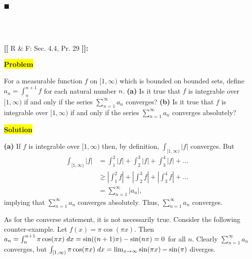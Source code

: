 \documentclass[12pt]{article}
\newcommand{\mybox}{%
    \collectbox{%
        \setlength{\fboxsep}{2pt}%
        \fbox{\BOXCONTENT}%
    }%
}
\begin{document}
\hfill$\blacksquare$

\vfill

\begin{center}
\\
\vspace{2mm}
\vspace{-0.65cm}
\hrulefill \\
\vspace{-0.95cm}
\hrulefill
\end{center}

\pagebreak

\noindent \textbf{{\huge [}{\Large [}} R \& F: Sec. 4.4, Pr. 29 \textbf{{\Large ]}{\huge ]}}{\Large \textbf{:}}

\vspace{3mm}

\noindent\mybox{\colorbox{yellow}{\textbf{Problem}}}\hspace{3mm}\hrulefill 

\noindent For a measurable function $f$ on $[1,\infty)$ which is bounded on bounded sets, define $a_n=\int_{n}^{n+1}f$ for each natural number $n$. \textcolor[rgb]{0.1,0.5,0.4}{\textbf{(a)}} Is it true that $f$ is integrable over $[1,\infty)$ if and only if the series $\sum\limits_{n=1}^{\infty} a_n$ converges? \textcolor[rgb]{0.1,0.5,0.4}{\textbf{(b)}} Is it true that $f$ is integrable over $[1,\infty)$ if and only if the series $\sum\limits_{n=1}^{\infty} a_n$ converges absolutely?

\vspace{5mm}

\noindent\mybox{\colorbox{yellow}{\textbf{Solution}}}\hspace{3mm}\hrulefill

    \noindent \textcolor[rgb]{0.1,0.5,0.4}{\textbf{(a)}} If $f$ is integrable over $[1,\infty)$ then, by definition, $\int_{[1,\infty)} |f|$ converges. But
\begin{align}
    \int_{[1,\infty)} |f| &= \int_{1}^{2} |f| + \int_{2}^{3} |f| + \int_{3}^{4} |f| + \ldots \\
    &\geq \left|\int_{1}^{2} f \right| + \left|\int_{2}^{3} f \right| + \left|\int_{3}^{4} f \right| + \ldots \\
    &= \sum\limits_{n=1}^{\infty} |a_n|,
\end{align}
implying that $\sum\limits_{n=1}^{\infty} a_n$ converges absolutely. Thus, $\sum\limits_{n=1}^{\infty} a_n$ converges. 

As for the converse statement, it is not necessarily true. Consider the following counter-example. Let $f(x) = \pi\cos(\pi x)$. Then $a_n = \int_{n}^{n+1} \pi \cos(\pi x) \hspace{1mm} dx = \sin((n+1)\pi) - \sin(n\pi) = 0$ for all $n$. Clearly $\sum\limits_{n=1}^{\infty} a_n$ converges, but $\int_{[1,\infty)} \pi\cos(\pi x) \hspace{1mm} dx = \lim_{x\rightarrow\infty}\sin(\pi x) - \sin(\pi)$ diverges.
\end{document}
